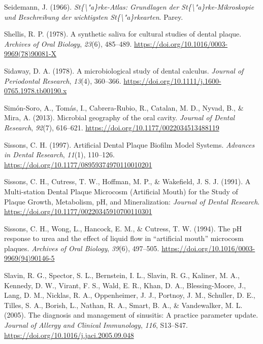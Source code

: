 \documentclass[
  letterpaper,
]{book}
\newlength{\cslhangindent}
\newlength{\cslentryspacingunit} %
\newenvironment{CSLReferences}[2] %
 {%
  \setlength{\parindent}{0pt}
  \ifodd #1
  \let\oldpar\par
  \def\par{\hangindent=\cslhangindent\oldpar}
  \fi
  \setlength{\parskip}{#2\cslentryspacingunit}
 }%
 {}
\begin{document}
\begin{CSLReferences}{1}{0}
\leavevmode{}%
Seidemann, J. (1966). \emph{St\{\textbackslash"a\}rke-{Atlas}:
{Grundlagen} der {St}\{\textbackslash"a\}rke-{Mikroskopie} und
{Beschreibung} der wichtigsten {St}\{\textbackslash"a\}rkearten}.
{Parey}.

\leavevmode{}%
Shellis, R. P. (1978). A synthetic saliva for cultural studies of dental
plaque. \emph{Archives of Oral Biology}, \emph{23}(6), 485--489.
\url{https://doi.org/10.1016/0003-9969(78)90081-X}

\leavevmode{}%
Sidaway, D. A. (1978). A microbiological study of dental calculus.
\emph{Journal of Periodontal Research}, \emph{13}(4), 360--366.
\url{https://doi.org/10.1111/j.1600-0765.1978.tb00190.x}

\leavevmode{}%
Simón-Soro, A., Tomás, I., Cabrera-Rubio, R., Catalan, M. D., Nyvad, B.,
\& Mira, A. (2013). Microbial geography of the oral cavity.
\emph{Journal of Dental Research}, \emph{92}(7), 616--621.
\url{https://doi.org/10.1177/0022034513488119}

\leavevmode{}%
Sissons, C. H. (1997). Artificial {Dental Plaque Biofilm Model Systems}.
\emph{Advances in Dental Research}, \emph{11}(1), 110--126.
\url{https://doi.org/10.1177/08959374970110010201}

\leavevmode{}%
Sissons, C. H., Cutress, T. W., Hoffman, M. P., \& Wakefield, J. S. J.
(1991). A {Multi-station Dental Plaque Microcosm} ({Artificial Mouth})
for the {Study} of {Plaque Growth}, {Metabolism}, {pH}, and
{Mineralization}: \emph{Journal of Dental Research}.
\url{https://doi.org/10.1177/00220345910700110301}

\leavevmode{}%
Sissons, C. H., Wong, L., Hancock, E. M., \& Cutress, T. W. (1994). The
{pH} response to urea and the effect of liquid flow in {``artificial
mouth''} microcosm plaques. \emph{Archives of Oral Biology},
\emph{39}(6), 497--505.
\url{https://doi.org/10.1016/0003-9969(94)90146-5}

\leavevmode{}%
Slavin, R. G., Spector, S. L., Bernstein, I. L., Slavin, R. G., Kaliner,
M. A., Kennedy, D. W., Virant, F. S., Wald, E. R., Khan, D. A.,
Blessing-Moore, J., Lang, D. M., Nicklas, R. A., Oppenheimer, J. J.,
Portnoy, J. M., Schuller, D. E., Tilles, S. A., Borish, L., Nathan, R.
A., Smart, B. A., \& Vandewalker, M. L. (2005). The diagnosis and
management of sinusitis: {A} practice parameter update. \emph{Journal of
Allergy and Clinical Immunology}, \emph{116}, S13--S47.
\url{https://doi.org/10.1016/j.jaci.2005.09.048}


\end{CSLReferences}
\end{document}

